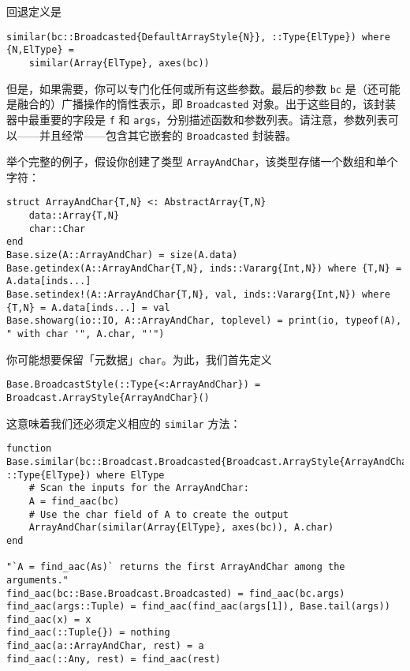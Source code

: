 回退定义是




\begin{verbatim}
similar(bc::Broadcasted{DefaultArrayStyle{N}}, ::Type{ElType}) where {N,ElType} =
    similar(Array{ElType}, axes(bc))
\end{verbatim}



但是，如果需要，你可以专门化任何或所有这些参数。最后的参数 \texttt{bc} 是（还可能是融合的）广播操作的惰性表示，即 \texttt{Broadcasted} 对象。出于这些目的，该封装器中最重要的字段是 \texttt{f} 和 \texttt{args}，分别描述函数和参数列表。请注意，参数列表可以——并且经常——包含其它嵌套的 \texttt{Broadcasted} 封装器。



举个完整的例子，假设你创建了类型 \texttt{ArrayAndChar}，该类型存储一个数组和单个字符：




\begin{verbatim}
struct ArrayAndChar{T,N} <: AbstractArray{T,N}
    data::Array{T,N}
    char::Char
end
Base.size(A::ArrayAndChar) = size(A.data)
Base.getindex(A::ArrayAndChar{T,N}, inds::Vararg{Int,N}) where {T,N} = A.data[inds...]
Base.setindex!(A::ArrayAndChar{T,N}, val, inds::Vararg{Int,N}) where {T,N} = A.data[inds...] = val
Base.showarg(io::IO, A::ArrayAndChar, toplevel) = print(io, typeof(A), " with char '", A.char, "'")
\end{verbatim}



你可能想要保留「元数据」\texttt{char}。为此，我们首先定义




\begin{verbatim}
Base.BroadcastStyle(::Type{<:ArrayAndChar}) = Broadcast.ArrayStyle{ArrayAndChar}()
\end{verbatim}



这意味着我们还必须定义相应的 \texttt{similar} 方法：




\begin{verbatim}
function Base.similar(bc::Broadcast.Broadcasted{Broadcast.ArrayStyle{ArrayAndChar}}, ::Type{ElType}) where ElType
    # Scan the inputs for the ArrayAndChar:
    A = find_aac(bc)
    # Use the char field of A to create the output
    ArrayAndChar(similar(Array{ElType}, axes(bc)), A.char)
end

"`A = find_aac(As)` returns the first ArrayAndChar among the arguments."
find_aac(bc::Base.Broadcast.Broadcasted) = find_aac(bc.args)
find_aac(args::Tuple) = find_aac(find_aac(args[1]), Base.tail(args))
find_aac(x) = x
find_aac(::Tuple{}) = nothing
find_aac(a::ArrayAndChar, rest) = a
find_aac(::Any, rest) = find_aac(rest)
\end{verbatim}



